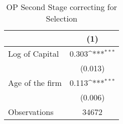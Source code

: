\begin{table}[htbp]\centering
\def\sym#1{\ifmmode^{#1}\else\(^{#1}\)\fi}
\caption{OP Second Stage correcting for Selection}
\begin{tabular}{l*{1}{c}}
\toprule
                    &\multicolumn{1}{c}{(1)}         \\
\midrule
Log of Capital      &       0.303\sym{***}\\
                    &     (0.013)         \\
\addlinespace
Age of the firm     &       0.113\sym{***}\\
                    &     (0.006)         \\
\midrule
Observations        &       34672         \\
\bottomrule
\end{tabular}
\end{table}
